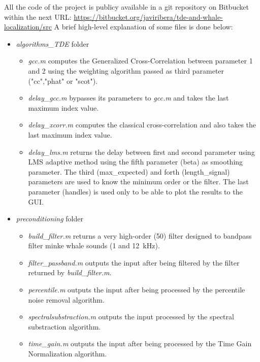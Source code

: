 All the code of the project is publicy available in a git repository on Bitbucket within the next URL: \url{https://bitbucket.org/javiribera/tde-and-whale-localization/src}
A brief high-level explanation of some files is done below:
\newpage

\begin{itemize}
  \item \emph{algorithms\_TDE} folder
    \begin{itemize}
      \item \emph{gcc.m} \cite{gcc.m} computes the Generalized Cross-Correlation between parameter 1 and 2 using the weighting algorithm passed as third parameter ("cc","phat" or "scot").
      \item \emph{delay\_gcc.m} \cite{delaygcc.m} bypasses its parameters to \emph{gcc.m} and takes the last maximum index value.
      \item \emph{delay\_xcorr.m} \cite{delayxcorr.m} computes the classical cross-correlation and also takes the last maximum index value.
      \item \emph{delay\_lms.m} \cite{delaylms.m} returns the delay between first and second parameter using LMS adaptive method using the fifth parameter (beta) as smoothing parameter. The third (max\_expected) and forth (length\_signal) parameters are used to know the minimum order or the filter. The last parameter (handles) is used only to be able to plot the results to the GUI.
    \end{itemize}
    
  \item \emph{preconditioning} folder
    \begin{itemize}
      \item \emph{build\_filter.m} \cite{buildfilter.m} returns a very high-order (50) filter designed to bandpass filter minke whale sounds (1 and \SI{12}{\kilo\Hz}).
      \item \emph{filter\_passband.m} \cite{filterpassband.m} outputs the input after being filtered by the filter returned by \emph{build\_filter.m}.
      \item \emph{percentile.m} \cite{percentile.m} outputs the input after being processed by the percentile noise removal algorithm.
      \item \emph{spectralsubstraction.m} \cite{spectralsubstraction.m} outputs the input processed by the spectral substraction algorithm.
      \item \emph{time\_gain.m} \cite{timegain.m} outputs the input after being processed by the Time Gain Normalization algorithm.
    \end{itemize}
    

\end{itemize}
